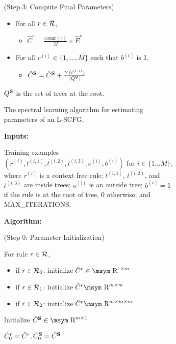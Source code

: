 \documentclass[11pt]{article}
\newcommand{\rione}{r^{(i)}}
\newcommand{\xione}{t^{(i,1)}}
\newcommand{\xitwo}{t^{(i,2)}}
\newcommand{\xithree}{t^{(i,3)}}
\newcommand{\oi}{o^{(i)}}
\newcommand{\rules}{{\cal R}}
\newcommand{\srule}{{X \rightarrow b, c}}
\newcommand{\e}[1]{\hat{#1}}
\newcommand{\bS}{{\bf S}}
\newcommand{\reals}{\mbox{\msym R}}
\begin{document}
\begin{figure*}[t!]
{\begin{footnotesize}
\begin{subfigure}{0.87\columnwidth}
	(Step 3: Compute Final Parameters)
	\begin{itemize}
		\item For all $r \in \rules$, 
			\begin{itemize}[label={}]
				\item $\e{C}^r = \frac{\textrm{count}(r)}{M} \times \e{E}^r$
			\end{itemize}
		\item For all $\rione \in \{1, \dots, M\}$ such that $b^{(i)}$ is 1, 
		\begin{itemize}[label={}]
			\item $\e{C}^\bS =  \e{C}^\bS + \frac{Y(\xione)}{|Q^\bS|} $
		\end{itemize}						
	\end{itemize}
	$Q^\bS$ is the set of trees at the root.  
	\caption{\small The spectral learning algorithm for estimating parameters of an L-SCFG.}
	\label{fig:splearn}
	\end{subfigure}
	\begin{subfigure}{1.05\columnwidth}
	{\bf Inputs:} 
	
	Training examples $(\rione, \xione, \xitwo, \xithree, \oi, b^{(i)})$ for $i \in \{1 \ldots M\}$, where $\rione$ is a context free rule; $\xione$, $\xitwo$, and $\xithree$ are inside trees; $\oi$ is an outside tree; $b^{(i)} = 1$ if the rule is at the root of tree, $0$ otherwise; and MAX\_ITERATIONS.

	{\bf Algorithm:}

	(Step 0: Parameter Initialization)
	
	For rule $r \in \rules$,
	\begin{itemize}[noitemsep]
		\item if $r \in \rules_0$: initialize $\e{C}^r \in \reals^{1 \times m}$ 
		\item if $r \in \rules_1$: initialize $\e{C}^r \reals^{m \times m}$ 
		\item if $r \in \rules_2$: initialize $\e{C}^r \reals^{m \times m \times m}$ 
	\end{itemize}
	
	Initialize $\e{C}^\bS \in \reals^{m \times 1}$ 
	
	$\e{C}_0^r = \e{C}^r, \e{C}_0^\bS = \e{C}^\bS$
	

\end{subfigure}
\end{footnotesize}}
\end{figure*}
\end{document}

